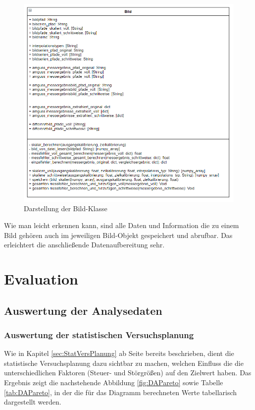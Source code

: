 \documentclass[
fontsize=10pt, 
listof = totoc,
parskip = half	
]{report}
\begin{document}
\begin{figure}[H]
	\centering
	\includegraphics[width=\textwidth, height=\textheight, keepaspectratio]{pics/class_image}
	\caption{Darstellung der Bild-Klasse}
	\label{fig:KlasseBild}
\end{figure}

\noindent Wie man leicht erkennen kann, sind alle Daten und Information die zu einem Bild gehören auch im jeweiligen Bild-Objekt gespeichert und abrufbar. Das erleichtert die anschließende Datenaufbereitung sehr.


\chapter{Evaluation}
\label{ch:Evaluation}

\section{Auswertung der Analysedaten}
\label{sec:AuswertungAnalysedaten}

\subsection{Auswertung der statistischen Versuchsplanung}
\label{subsubsec:AuswertungStatVpl}
Wie in Kapitel \ref{sec:StatVersPlanung} ab Seite \pageref{sec:StatVersPlanung} bereits beschrieben, dient die statistische Versuchsplanung dazu sichtbar zu machen, welchen Einfluss die die unterschiedlichen Faktoren (Steuer- und Störgrößen) auf den Zielwert haben. Das Ergebnis zeigt die nachstehende Abbildung \ref{fig:DAPareto} sowie Tabelle \ref{tab:DAPareto}, in der die für das Diagramm berechneten Werte tabellarisch dargestellt werden. 
\end{document}
